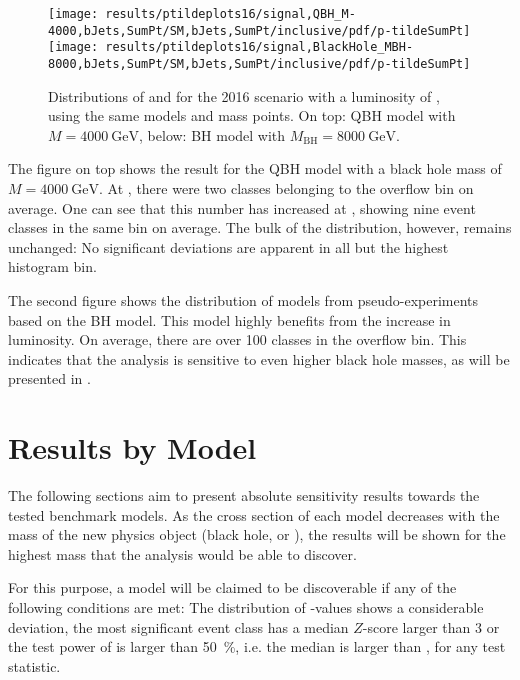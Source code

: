 \begin{figure}[p]
    \centering
    \texttt{[image: results/ptildeplots16/signal,QBH\_M-4000,bJets,SumPt/SM,bJets,SumPt/inclusive/pdf/p-tildeSumPt]}
    \texttt{[image: results/ptildeplots16/signal,BlackHole\_MBH-8000,bJets,SumPt/SM,bJets,SumPt/inclusive/pdf/p-tildeSumPt]}
    \caption{Distributions of  and  for the 2016 scenario with a luminosity of \lumiB, using the same models and mass points. On top: \acl{QBH} model with $M = \SI{4000}{\GeV}$, below: \acl{BH} model with $M_\text{BH} = \SI{8000}{\GeV}$.}
    \label{fig:results_lumichange}
\end{figure}

The figure on top shows the result for the \ac{QBH} model with a black hole mass of $M = \SI{4000}{\GeV}$. At \lumiA, there were two classes belonging to the overflow bin on average. One can see that this number has increased at \lumiB, showing nine event classes in the same bin on average. The bulk of the distribution, however, remains unchanged: No significant deviations are apparent in all but the highest histogram bin.

The second figure shows the distribution of \ptilde models from pseudo-experiments based on the \ac{BH} model. This model highly benefits from the increase in luminosity. On average, there are over \num{100} classes in the overflow bin. This indicates that the analysis is sensitive to even higher black hole masses, as will be presented in .

\section{Results by Model}
\label{sec:results}

The following sections aim to present absolute sensitivity results towards the tested benchmark models. As the cross section of each model decreases with the mass of the new physics object (black hole, \PSigma or \PWprime), the results will be shown for the highest mass that the analysis would be able to discover.

For this purpose, a model will be claimed to be discoverable if any of the following conditions are met: The distribution of \ptilde-values shows a considerable deviation, the most significant event class has a median $Z$-score larger than \num{3} or the test power of \TSphat is larger than \SI{50}{\percent}, i.e. the median \TSphat is larger than \TSphatcrit, for any test statistic.

